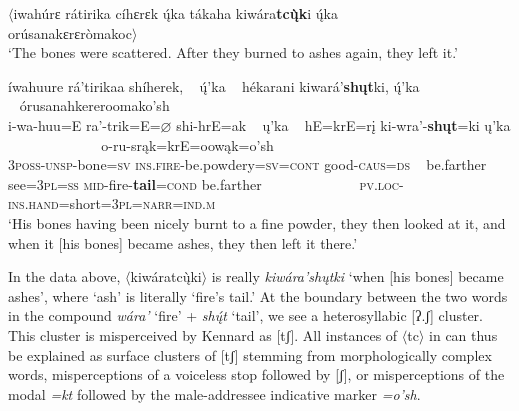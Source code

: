 \begin{exe}

\item\label{noTS2}

	\begin{xlist}

	\item $\langle$iwahúrɛ rátirika cíhɛrɛk ų́ka tákaha kiwára\textbf{tcų̀k}i ų́ka \\
	 orúsanakɛrɛròmakoc$\rangle$\\
	`The bones were scattered. After they burned to ashes again, they left it.' \citep[275]{kennard1934}

	\item \glll íwahuure rá'tirikaa shíherek, ~ ų́'ka ~ hékarani kiwará'\textbf{shųt}ki, ų́'ka ~ ~ ~ ~ ~ ~ ~ ~ órusanahkereroomako'sh\\
		i-wa-huu=E ra'-trik=E=$\varnothing$ shi-hrE=ak ~ ų'ka ~  hE=krE=rį ki-wra'-\textbf{shųt}=ki ų'ka ~ ~ ~ ~ ~ ~ ~ ~ o-ru-srąk=krE=oowąk=o'sh\\
		\textsc{3poss-unsp}-\textnormal{bone}=\textsc{sv} \textsc{ins.fire}-\textnormal{be.powdery}=\textsc{sv=cont} \textnormal{good}-\textsc{caus=ds} ~ \textnormal{be.farther} ~ \textnormal{see}=\textsc{3pl=ss} \textsc{mid}-\textnormal{fire}-\textbf{\textnormal{tail}}=\textsc{cond} \textnormal{be.farther} ~ ~ ~ ~ ~ ~ ~ ~ \textsc{pv.loc-ins.hand}=\textnormal{short}=\textsc{3pl=narr=ind.m}\\
	\glt `His bones having been nicely burnt to a fine powder, they then looked at it, and when it [his bones] became ashes, they then left it there.' \citep[136]{hollow1973b}

	\end{xlist}

\end{exe}

In the data above,  $\langle$kiwáratcų̀ki$\rangle$ is really \textit{kiwára'shųtki} `when [his bones] became ashes', where `ash' is literally `fire's tail.' At the boundary between the two words in the compound \textit{wára'} `fire' + \textit{shų́t} `tail', we see a heterosyllabic [ʔ.ʃ] cluster. This cluster is misperceived by Kennard as [tʃ]. All instances of $\langle$tc$\rangle$ in \citet{kennard1934,kennard1936} can thus be explained as surface clusters of [tʃ] stemming from morphologically complex words, misperceptions of a voiceless stop followed by [ʃ], or misperceptions of the modal \textit{=kt} followed by the male-addressee indicative marker \textit{=o'sh}.

